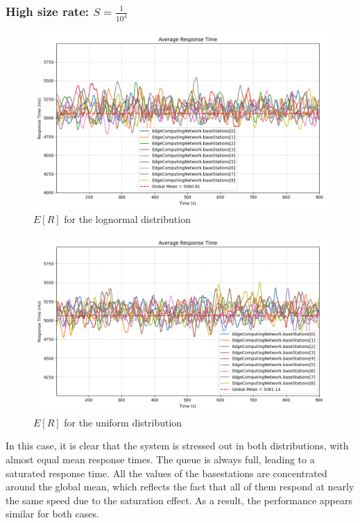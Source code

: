 \documentclass{report}
\begin{document}
\subsubsection*{High size rate: $S=\frac{1}{10^4}$}

\begin{figure}[H]
    \centering
    \includegraphics[width=\textwidth]{img/plots/log_1e4_B/resptime.png}
    \caption{$E[R]$ for the lognormal distribution}
\end{figure}

\begin{figure}[H]
    \centering
    \includegraphics[width=\textwidth]{img/plots/uni_1e4_B/resptime.png}
    \caption{$E[R]$ for the uniform distribution}
\end{figure}

In this case, it is clear that the system is stressed out in both distributions, with almost equal mean response times. The queue is always full, leading to a saturated response time. All the values of the basestations are concentrated around the global mean, which reflects the fact that all of them respond at nearly the same speed due to the saturation effect. As a result, the performance appears similar for both cases.
\end{document}
